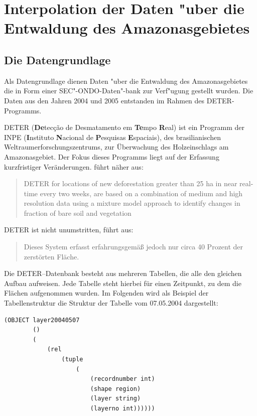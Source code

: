 \chapter[Interpolation der Daten "uber Entwaldung]{Interpolation der Daten "uber die Entwaldung des Amazonasgebietes} \label{Kapitel5}


\section{Die Datengrundlage}
Als Datengrundlage dienen Daten "uber die Entwaldung des Amazonasgebietes die in Form einer SEC"-ONDO-Daten"-bank zur Verf"ugung gestellt wurden. Die Daten aus den Jahren 2004 und 2005 entstanden im Rahmen des DETER-Programms.

DETER (\textbf{De}tecção de Desmatamento em \textbf{Te}mpo \textbf{R}eal) ist ein Programm der INPE (\textbf{I}nstituto \textbf{N}acional de \textbf{P}esquisas \textbf{E}spaciais), des brasilianischen Weltraumerforschungszentrums, zur Überwachung des Holzeinschlags am Amazonasgebiet. Der Fokus dieses Programms liegt auf der Erfassung kurzfristiger Veränderungen. \cite{DeF} führt näher aus:
\begin{quotation}
DETER for locations of new deforestation greater than
25 ha in near real-time every two weeks, are based on
a combination of medium and high resolution data using
a mixture model approach to identify changes in
fraction of bare soil and vegetation 
\end{quotation} 
DETER ist nicht unumstritten, \cite{Green} führt aus:
\begin{quotation}
Dieses System erfasst erfahrungsgemäß jedoch nur circa 40 Prozent der zerstörten Fläche.
\end{quotation} 

\newpage
Die DETER--Datenbank besteht aus mehreren Tabellen, die alle den gleichen Aufbau aufweisen. Jede Tabelle steht hierbei für einen Zeitpunkt, zu dem die Flächen aufgenommen wurden. Im Folgenden wird als Beispiel der Tabellenstruktur die Struktur der Tabelle vom 07.05.2004 dargestellt:
\begin{verbatim}
(OBJECT layer20040507 
        ()
        (
            (rel 
                (tuple 
                    (
                        (recordnumber int)
                        (shape region)
                        (layer string)
                        (layerno int))))))
\end{verbatim} 

